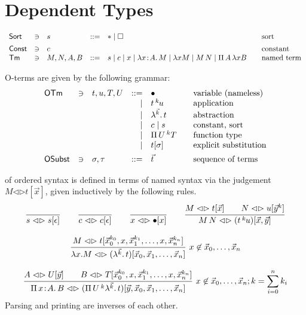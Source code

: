 \documentclass[a4paper]{article}
\newcommand{\OTm}{\mathsf{OTm}}
\newcommand{\OSubst}{\mathsf{OSubst}}
\newcommand{\oann}[1]{{}^{#1}\kern-0.15ex}
\newcommand{\ovar}{\mathord{\bullet}}
\newcommand{\oapp}[1]{\,\oann{#1}}
\newcommand{\olam}[1]{\lambda^{#1}.\,}
\newcommand{\opi}[2]{\Pi\,#1\,^{#2}}
\newcommand{\lrhd}{\mathrel{\mathord{\lhd}\mathord{\rhd}}}
\newcommand{\osyn}[3]{#1 \lrhd \esubst{#2}{#3}}
\newcommand{\osynp}[3]{\osyn{#1}{(#2)}{#3}}
\renewcommand{\esubst}[2]{#1[#2]}
\renewcommand{\funT}[2]{\Pi\,#1\of#2.\,}
\begin{document}
\section{Dependent Types}

\[
\begin{array}{lllrl@{\qquad}l}
\Sort & \ni & s & ::= & \ttype \mid \tkind & \mbox{sort} \\[1ex]
\Const & \ni & c &&& \mbox{constant} \\
\Tm    & \ni & M,N,A,B & ::= & s \mid c \mid x \mid \lam x A M
  \mid \lambda x M \mid M \, N \mid \Pi\,A\,\lambda x B
   & \mbox{named term}\\
\end{array}
\]


 O-terms are given by the following grammar:
\[
\begin{array}{lllrl@{\qquad}l}
\OTm & \ni & t,u,T,U & ::= & \ovar & \mbox{variable (nameless)} \\
&&& \mid & t \oapp k u & \mbox{application} \\
&&& \mid & \olam {\vec k} t & \mbox{abstraction} \\
&&& \mid & c \mid s & \mbox{constant, sort} \\
&&& \mid & \opi U k T & \mbox{function type} \\
&&& \mid & \esubst t \sigma & \mbox{explicit substitution}
\\[1ex]
\OSubst & \ni & \sigma,\tau & ::= & \vec t & \mbox{sequence of terms}\\
\end{array}
\]

 of ordered syntax is defined in terms of named
syntax via the
judgement $\osyn M t {\vec x}$, given inductively by the following rules.
\begin{gather*}
  \ru{}{\osyn s s \epsilon}
\qquad
  \ru{}{\osyn c c \epsilon}
\qquad
  \ru{}{\osyn x \ovar x}
\qquad
  \ru{\osyn M t {\vec x} \qquad
      \osyn N u {\vec y^k}
    }{\osynp {M\,N} {t \oapp k u} {\vec x, \vec y}}
\\[2ex]
  \rux{\osyn M t {\vec x_0^{k_0},x,\vec x_1^{k_1},\dots,x,\vec x_n^{k_n}}
     }{\osynp {\lambda x.M} {\olam {\vec k} t}
         {\vec x_0,\vec x_1,\dots,\vec x_n}
    }{x \not\in \vec x_0,\dots,\vec x_n}
\\[2ex]
  \rux{\osyn A U {\vec y} \qquad
       \osyn B T {\vec x_0^{k_0},x,\vec x_1^{k_1},\dots,x,\vec x_n^{k_n}}
     }{\osynp {\funT x A B} {\opi U k {\olam {\vec k} t}}
         {\vec y,\vec x_0,\vec x_1,\dots,\vec x_n}
     }{x \not\in \vec x_0,\dots,\vec x_n;
       k = \sum_{i=0}^n k_i}
\end{gather*}
Parsing and printing are inverses of each other.
\end{document}

